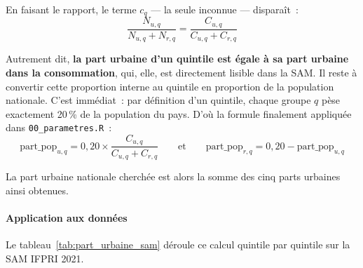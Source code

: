 \documentclass[12pt,a4paper,french]{report}
\begin{document}
		En faisant le rapport, le terme $c_q$ — la seule inconnue — disparaît~:
		\begin{equation}
			\frac{N_{u,q}}{N_{u,q} + N_{r,q}} = \frac{C_{u,q}}{C_{u,q} + C_{r,q}}
			\label{eq:sam_part_urbaine_quintile}
		\end{equation}

		Autrement dit, \textbf{la part urbaine d'un quintile est égale à sa part urbaine dans la consommation}, qui, elle, est directement lisible dans la SAM. Il reste à convertir cette proportion interne au quintile en proportion de la population nationale. C'est immédiat~: par définition d'un quintile, chaque groupe $q$ pèse exactement 20\,\% de la population du pays. D'où la formule finalement appliquée dans \texttt{00\_parametres.R}~:
		\begin{equation}
			\text{part\_pop}_{u,q} = 0{,}20 \times \frac{C_{u,q}}{C_{u,q} + C_{r,q}}
			\qquad\text{et}\qquad
			\text{part\_pop}_{r,q} = 0{,}20 - \text{part\_pop}_{u,q}
			\label{eq:sam_part_pop_groupe}
		\end{equation}

		La part urbaine nationale cherchée est alors la somme des cinq parts urbaines ainsi obtenues.

		\paragraph{Application aux données}
		Le tableau~\ref{tab:part_urbaine_sam} déroule ce calcul quintile par quintile sur la SAM IFPRI 2021.
\end{document}
